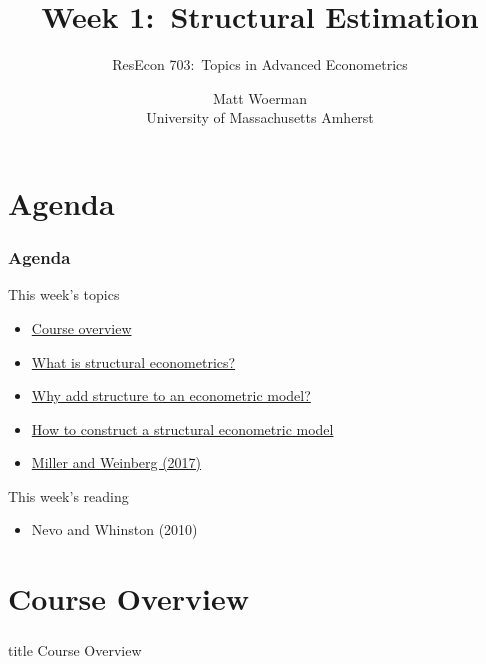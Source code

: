\documentclass{beamer}
\title[Week 1:\ Structural Estimation]{Week 1:\ Structural Estimation}
\author[ResEcon 703:\ Advanced Econometrics]{ResEcon 703:\ Topics in Advanced Econometrics}
\date{Matt Woerman\\University of Massachusetts Amherst}
\begin{document}
{ 
\begin{frame}[noframenumbering]
    \titlepage
\end{frame}
}

\section{Agenda}
\begin{frame}\frametitle{Agenda}
    This week's topics
    \begin{itemize}
    	\item \hyperlink{page.\getpagerefnumber{overview}}{Course overview}
        \item \hyperlink{page.\getpagerefnumber{what}}{What is structural econometrics?}
        \item \hyperlink{page.\getpagerefnumber{why}}{Why add structure to an econometric model?}
        \item \hyperlink{page.\getpagerefnumber{how}}{How to construct a structural econometric model}
        \item \hyperlink{page.\getpagerefnumber{mw}}{Miller and Weinberg (2017)}
    \end{itemize}
    \vspace{2ex}
    This week's reading
    \begin{itemize}
        \item Nevo and Whinston (2010)
    \end{itemize}
\end{frame}

\section{Course Overview}
\label{overview}
\begin{frame}\frametitle{}
    \vfill
    \centering
    \begin{beamercolorbox}[center]{title}
        \Large Course Overview
    \end{beamercolorbox}
    \vfill
\end{frame}
\end{document}
